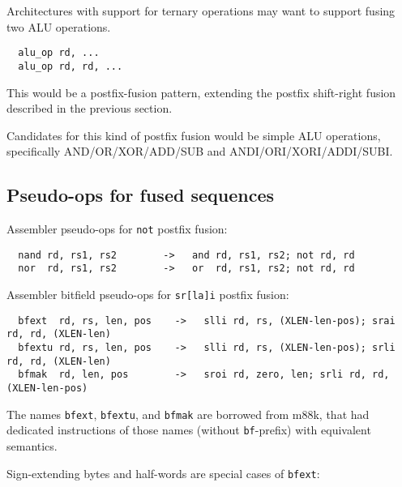 Architectures with support for ternary operations may want to support fusing two ALU operations.

\begin{minipage}{\linewidth}
\begin{verbatim}
  alu_op rd, ...
  alu_op rd, rd, ...
\end{verbatim}
\end{minipage}

This would be a postfix-fusion pattern, extending the postfix shift-right
fusion described in the previous section.

Candidates for this kind of postfix fusion would be simple ALU operations, specifically
AND/OR/XOR/ADD/SUB and ANDI/ORI/XORI/ADDI/SUBI.


\subsection{Pseudo-ops for fused sequences}

Assembler pseudo-ops for {\tt not} postfix fusion:

\begin{minipage}{\linewidth}
\begin{verbatim}
  nand rd, rs1, rs2        ->   and rd, rs1, rs2; not rd, rd
  nor  rd, rs1, rs2        ->   or  rd, rs1, rs2; not rd, rd
\end{verbatim}
\end{minipage}

Assembler bitfield pseudo-ops for {\tt sr[la]i} postfix fusion:

\begin{minipage}{\linewidth}
\begin{verbatim}
  bfext  rd, rs, len, pos    ->   slli rd, rs, (XLEN-len-pos); srai rd, rd, (XLEN-len)
  bfextu rd, rs, len, pos    ->   slli rd, rs, (XLEN-len-pos); srli rd, rd, (XLEN-len)
  bfmak  rd, len, pos        ->   sroi rd, zero, len; srli rd, rd, (XLEN-len-pos)
\end{verbatim}
\end{minipage}

The names {\tt bfext}, {\tt bfextu}, and {\tt bfmak} are borrowed from m88k, that had
dedicated instructions of those names (without {\tt bf}-prefix) with equivalent semantics.~\cite[p.~3-28]{m88k}

Sign-extending bytes and half-words are special cases of {\tt bfext}:


